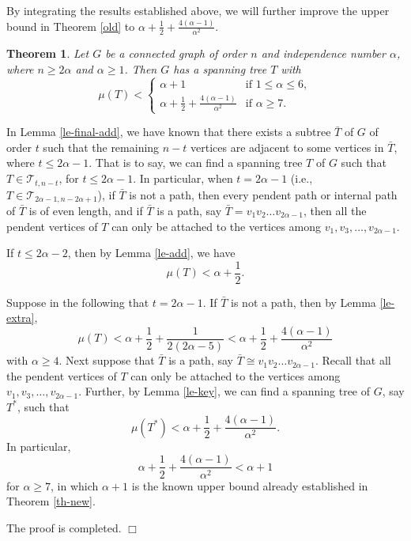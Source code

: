 \documentclass[12pt]{article}
\newtheorem{Theorem}{Theorem}[section]
\newenvironment {Proof} {\noindent {\bf Proof.}}{\hspace*{\fill}$\Box$\par\vspace{4mm}}
\begin{document}
By integrating the results established above, we will further improve the upper bound in Theorem \ref{old} to $\alpha + \frac{1}{2} + \frac{4(\alpha-1)}{\alpha^2}$.

\begin{Theorem} \label{th-1}
Let $G$ be a connected graph of order $n$ and independence number $\alpha$, where $n \ge 2 \alpha$ and $\alpha \ge 1$. Then $G$ has a spanning tree $T$ with
$$
\renewcommand{\arraystretch}{1.2}
\mu(T) < \left\{\begin{array}{ll}
\alpha + 1  & \mbox{if $1 \le \alpha \le 6$},\\
 \alpha + \frac{1}{2} + \frac{4(\alpha-1)}{\alpha^2}
 & \mbox{if $\alpha \ge 7$}.
\end{array}
\right.
$$
\end{Theorem}

\begin{Proof}
In Lemma \ref{le-final-add}, we have known that there exists a subtree $\bar{T}$ of $G$ of order $t$ such that the remaining $n-t$ vertices are adjacent to some vertices in $\bar{T}$, where $t \le 2 \alpha - 1$. That is to say, we can find a spanning tree $T$ of $G$ such that $T \in \mathcal{T}_{t, n-t}$, for $t \le 2 \alpha - 1$. In particular,  when $t = 2 \alpha - 1$ (i.e., $T \in \mathcal{T}_{2 \alpha - 1, n-2 \alpha + 1}$), if $\bar{T}$ is not a path, then every pendent path or internal path of $\bar{T}$ is of even length, and if $\bar{T}$ is a path, say $\bar{T} = v_1 v_2 \dots v_{2 \alpha - 1}$, then all the pendent vertices of $T$ can only be attached to the vertices among $v_1, v_3, \dots, v_{2 \alpha - 1}$.

If $t \le 2 \alpha - 2$, then by Lemma \ref{le-add}, we have
$$
\mu(T) < \alpha + \frac{1}{2}.
$$

Suppose in the following that $t = 2 \alpha - 1$. If $\bar{T}$ is not a path, then by Lemma \ref{le-extra},
$$
\mu (T) < \alpha + \frac{1}{2} + \frac{1}{2(2\alpha-5)} < \alpha + \frac{1}{2} + \frac{4(\alpha-1)}{\alpha^2}
$$
with $\alpha \ge 4$.
Next suppose that $\bar{T}$ is a path, say $\bar{T} \cong v_1 v_2 \dots v_{2\alpha - 1}$. Recall that all the pendent vertices of $T$ can only be attached to the vertices among $v_1, v_3, \dots, v_{2 \alpha - 1}$. Further, by Lemma \ref{le-key}, we can find a spanning tree of $G$, say $T^*$, such that
$$
\mu(T^*) < \alpha + \frac{1}{2} + \frac{4(\alpha-1)}{\alpha^2}.
$$
In particular,
$$
\alpha + \frac{1}{2} + \frac{4(\alpha-1)}{\alpha^2} < \alpha + 1
$$
for $\alpha \ge 7$, in which $\alpha + 1$ is the known upper bound already established in Theorem \ref{th-new}.


The proof is completed.
\end{Proof}
\end{document}
